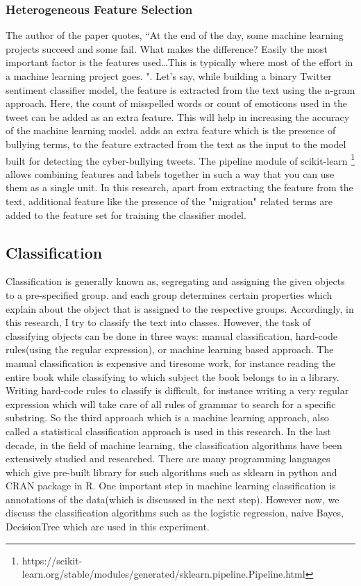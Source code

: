 \subsubsection{Heterogeneous Feature Selection} \label{hetero}
The author of the paper \cite{Domingos:2012} quotes, ``At the end of the day, some machine learning projects succeed and some fail. What makes the difference? Easily the most important factor is the features used…This is typically where most of the effort in a machine learning project goes. ".  Let's say, while building a binary Twitter sentiment classifier model, the feature is extracted from the text using the n-gram approach. Here, the count of misspelled words or count of emoticons used in the tweet can be added as an extra feature. This will help in increasing the accuracy of the machine learning model. \cite{Cortis} adds an extra feature which is the presence of bullying terms, to the feature extracted from the text as the input to the model built for detecting the cyber-bullying tweets. The pipeline module of scikit-learn \cite{scikit-learn} \footnote{https://scikit-learn.org/stable/modules/generated/sklearn.pipeline.Pipeline.html} allows combining features and labels together in such a way that you can use them as a single unit. In this research,  apart from extracting the feature from the text, additional feature like the presence of the "migration" related terms are added to the feature set for training the classifier model. 
\subsection{Classification}
Classification is generally known as, segregating and assigning the given objects to a pre-specified group. and each group determines certain properties which explain about the object that is assigned to the respective groups. Accordingly, in this research, I try to classify the text into classes. However, the task of classifying objects can be done in three ways:  manual classification, hard-code rules(using the regular expression), or machine learning based approach. The manual classification is expensive and tiresome work, for instance reading the entire book while classifying to which subject the book belongs to in a library. Writing hard-code rules to classify is difficult, for instance writing a very regular expression which will take care of all rules of grammar to search for a specific substring. So the third approach which is a machine learning approach, also called a statistical classification approach is used in this research. In the last decade, in the field of machine learning, the classification algorithms have been extensively studied and researched. There are many programming languages which give pre-built library for such algorithms such as sklearn \cite{scikit-learn} in python and  CRAN package in R. One important step in machine learning classification is annotations of the data(which is discussed in the next step). However now, we discuss the classification algorithms such as the logistic regression, naive Bayes, DecisionTree which are used in this experiment.

